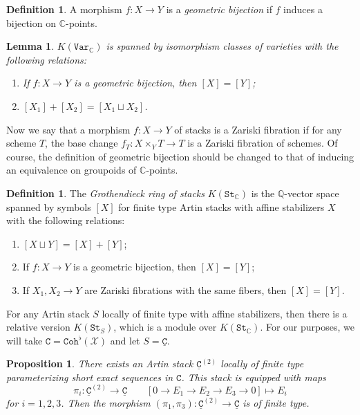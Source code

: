 \documentclass{amsart}
\newtheorem{prop}[thm]{Proposition}
\newtheorem{lem}[thm]{Lemma}
\theoremstyle{definition}
\newtheorem{defn}[thm]{Definition}
\theoremstyle{remark}
\theoremstyle{plain}
\theoremstyle{definition}
\theoremstyle{remark}
\newcommand{\C}{\mathbb{C}}
\newcommand{\Q}{\mathbb{Q}}
\newcommand{\mc}[1]{\mathcal{#1}}
\newcommand{\mt}[1]{\mathtt{#1}}
\newcommand{\ul}[1]{\underline{#1}}
\newcommand{\1}{\mathbf{1}}
\newcommand{\2}{\mathbf{2}}
\newcommand{\3}{\mathbf{3}}
\begin{document}
\begin{defn}
    A morphism $f \colon X \to Y$ is a \textit{geometric bijection} if $f$ induces a bijection on $\C$-points.
\end{defn}

\begin{lem}
    $K(\mt{Var}_{\C})$ is spanned by isomorphism classes of varieties with the following relations:
    \begin{enumerate}
        \item If $f \colon X \to Y$ is a geometric bijection, then $[X] = [Y]$;
        \item $[X_1] + [X_2] = [X_1 \sqcup X_2]$.
    \end{enumerate}
\end{lem}

Now we say that a morphism $f \colon X \to Y$ of stacks is a Zariski fibration if for any scheme $T$, the base change $f_T \colon X \times_{Y} T \to T$ is a Zariski fibration of schemes. Of course, the definition of geometric bijection should be changed to that of inducing an equivalence on groupoids of $\C$-points.

\begin{defn}
    The \textit{Grothendieck ring of stacks} $K(\mt{St}_{\C})$ is the $\Q$-vector space spanned by symbols $[X]$ for finite type Artin stacks with affine stabilizers $X$ with the following relations:
    \begin{enumerate}
        \item $[X \sqcup Y] = [X] + [Y]$;
        \item If $f \colon X \to Y$ is a geometric bijection, then $[X] = [Y]$;
        \item If $X_1, X_2 \to Y$ are Zariski fibrations with the same fibers, then $[X] = [Y]$.
    \end{enumerate}
\end{defn}
For any Artin stack $S$ locally of finite type with affine stabilizers, then there is a relative version $K(\mt{St}_S)$, which is a module over $K(\mt{St}_{\C})$. For our purposes, we will take $\mt{C} = \mt{Coh}^{\flat}(\mc{X})$ and let $S = \mt{\ul{C}}$. 

\begin{prop}
    There exists an Artin stack $\mt{\ul{C}}^{(2)}$ locally of finite type parameterizing short exact sequences in $\mt{C}$. This stack is equipped with maps
    \[ \pi_i \colon \mt{\ul{C}}^{(2)} \to \mt{\ul{C}} \qquad [0 \to E_1 \to E_2 \to E_3 \to 0] \mapsto E_i \]
    for $i = 1,2,3$. Then the morphism $(\pi_1, \pi_3) \colon \mt{\ul{C}}^{(2)} \to \mt{\ul{C}}$ is of finite type.
\end{prop}
\end{document}
